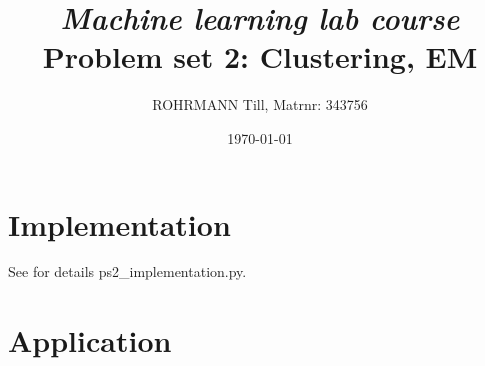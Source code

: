 \documentclass[a4paper, 12pt, titlepage]{article}
\title
{{\em Machine learning lab course}\\
Problem set 2: Clustering, EM}
\author{ROHRMANN Till, Matrnr: 343756}
\date{\today}
\begin{document}
\maketitle

\part{Implementation}

See for details ps2\_implementation.py.

\part{Application}
\end{document}

